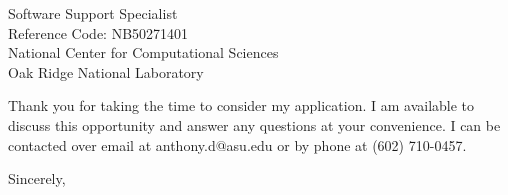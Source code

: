 \documentclass[11pt,letterpaper]{letter}
\begin{document}
\begin{letter}{
Software Support Specialist \\
Reference Code: NB50271401\\
National Center for Computational Sciences\\
Oak Ridge National Laboratory
}

\noindent Thank you for taking the time to consider my application.
I am available to discuss this opportunity and answer any questions at your convenience.
I can be contacted over email at anthony.d@asu.edu or by phone at (602) 710-0457.

\closing{Sincerely,}

\vfill
\end{letter}
\end{document}
